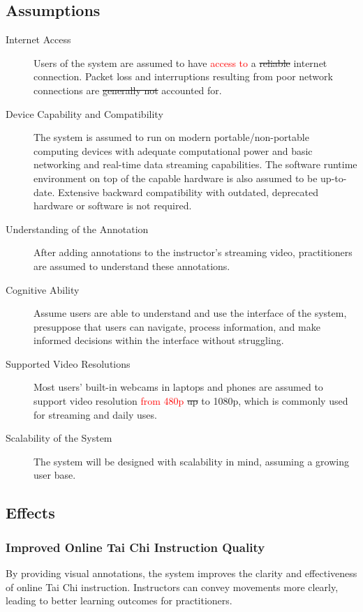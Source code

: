 \documentclass[12pt]{article}
\begin{document}
\subsection{Assumptions}
\begin{description}
    \item[Internet Access] Users of the system are assumed to have \textcolor{red}{access to }a \sout{reliable} internet connection. Packet loss and interruptions resulting from poor network connections are \sout{generally not} accounted for.
    \item[Device Capability and Compatibility] The system is assumed to run on modern portable/non-portable computing devices with adequate computational power and basic networking and real-time data streaming capabilities. The software runtime environment on top of the capable hardware is also assumed to be up-to-date. Extensive backward compatibility with outdated, deprecated hardware or software is not required.
    \item[Understanding of the Annotation] After adding annotations to the instructor’s streaming video, practitioners are assumed to understand these annotations.
    \item[Cognitive Ability] Assume users are able to understand and use the interface of the system, presuppose that users can navigate, process information, and make informed decisions within the interface without struggling.
    \item[Supported Video Resolutions] Most users’ built-in webcams in laptops and phones are assumed to support video resolution \textcolor{red}{from 480p} \sout{up} to 1080p, which is commonly used for streaming and daily uses.
    \item[Scalability of the System] The system will be designed with scalability in mind, assuming a growing user base.
\end{description}

\subsection{Effects}
\subsubsection{Improved Online Tai Chi Instruction Quality}
By providing visual annotations, the system improves the clarity and effectiveness of online Tai Chi instruction. Instructors can convey movements more clearly, leading to better learning outcomes for practitioners.
\end{document}
